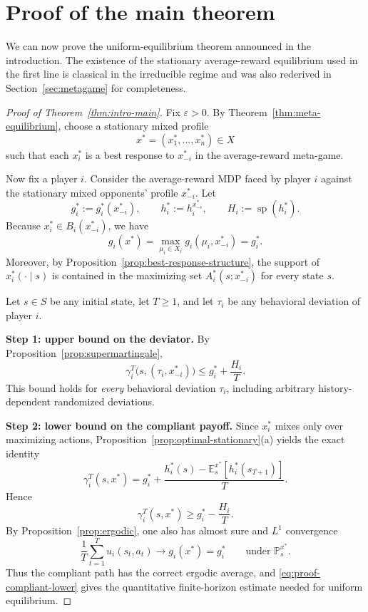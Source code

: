 \documentclass[11pt]{article}
\theoremstyle{definition}
\newcommand{\E}{\mathbb{E}}
\newcommand{\Prob}{\mathbb{P}}
\newcommand{\1}{\mathbf{1}}
\DeclareMathOperator{\spn}{sp}
\begin{document}
\section{Proof of the main theorem}\label{sec:proof-main}

We can now prove the uniform-equilibrium theorem announced in the introduction. The existence of the stationary average-reward equilibrium used in the first line is classical in the irreducible regime and was also rederived in Section~\ref{sec:metagame} for completeness.

\begin{proof}[Proof of Theorem~\ref{thm:intro-main}]
Fix $\varepsilon>0$. By Theorem~\ref{thm:meta-equilibrium}, choose a stationary mixed profile
\[
x^*=(x_1^*,\dots,x_n^*)\in X
\]
such that each $x_i^*$ is a best response to $x_{-i}^*$ in the average-reward meta-game.

Now fix a player $i$. Consider the average-reward MDP faced by player $i$ against the stationary mixed opponents' profile $x_{-i}^*$. Let
\[
g_i^*:=g_i^*(x_{-i}^*),\qquad h_i^*:=h_i^{x_{-i}^*},\qquad H_i:=\spn(h_i^*).
\]
Because $x_i^*\in B_i(x_{-i}^*)$, we have
\[
g_i(x^*)=\max_{\mu_i\in X_i}g_i(\mu_i,x_{-i}^*)=g_i^*.
\]
Moreover, by Proposition~\ref{prop:best-response-structure}, the support of $x_i^*(\cdot\mid s)$ is contained in the maximizing set $A_i^*(s;x_{-i}^*)$ for every state $s$.

Let $s\in S$ be any initial state, let $T\ge1$, and let $\tau_i$ be any behavioral deviation of player $i$.

\smallskip
\noindent
\textbf{Step 1: upper bound on the deviator.}
By Proposition~\ref{prop:supermartingale},
\begin{equation}\label{eq:proof-dev-upper}
\gamma_i^T\bigl(s,(\tau_i,x_{-i}^*)\bigr)\le g_i^*+\frac{H_i}{T}.
\end{equation}
This bound holds for \emph{every} behavioral deviation $\tau_i$, including arbitrary history-dependent randomized deviations.

\smallskip
\noindent
\textbf{Step 2: lower bound on the compliant payoff.}
Since $x_i^*$ mixes only over maximizing actions, Proposition~\ref{prop:optimal-stationary}(a) yields the exact identity
\[
\gamma_i^T(s,x^*)=g_i^*+\frac{h_i^*(s)-\E_s^{x^*}[h_i^*(s_{T+1})]}{T}.
\]
Hence
\begin{equation}\label{eq:proof-compliant-lower}
\gamma_i^T(s,x^*)\ge g_i^* - \frac{H_i}{T}.
\end{equation}
By Proposition~\ref{prop:ergodic}, one also has almost sure and $L^1$ convergence
\[
\frac1T\sum_{t=1}^{T}u_i(s_t,a_t)\longrightarrow g_i(x^*)=g_i^*
\qquad\text{under }\Prob_s^{x^*}.
\]
Thus the compliant path has the correct ergodic average, and \eqref{eq:proof-compliant-lower} gives the quantitative finite-horizon estimate needed for uniform equilibrium.


\end{proof}
\end{document}
